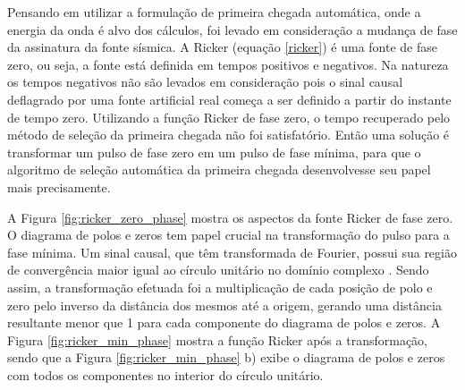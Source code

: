Pensando em utilizar a formulação de primeira chegada automática, onde a energia da onda é alvo dos cálculos, foi levado em consideração a mudança de fase da assinatura da fonte sísmica. A Ricker (equação \ref{ricker}) é uma fonte de fase zero, ou seja, a fonte está definida em tempos positivos e negativos. Na natureza os tempos negativos não são levados em consideração pois o sinal causal deflagrado por uma fonte artificial real começa a ser definido a partir do instante de tempo zero. Utilizando a função Ricker de fase zero, o tempo recuperado pelo método de seleção da primeira chegada não foi satisfatório. Então uma solução é transformar um pulso de fase zero em um pulso de fase mínima, para que o algoritmo de seleção automática da primeira chegada desenvolvesse seu papel mais precisamente.

A Figura \ref{fig:ricker_zero_phase} mostra os aspectos da fonte Ricker de fase zero. O diagrama de polos e zeros tem papel crucial na transformação do pulso para a fase mínima. Um sinal causal, que têm transformada de Fourier, possui sua região de convergência maior igual ao círculo unitário no domínio complexo \cite{proakis1975digital, oppenheim1987digital, oppenheim1997signals}. Sendo assim, a transformação efetuada foi a multiplicação de cada posição de polo e zero pelo inverso da distância dos mesmos até a origem, gerando uma distância resultante menor que 1 para cada componente do diagrama de polos e zeros. A Figura \ref{fig:ricker_min_phase} mostra a função Ricker após a transformação, sendo que a Figura \ref{fig:ricker_min_phase} b) exibe o diagrama de polos e zeros com todos os componentes no interior do círculo unitário.    


